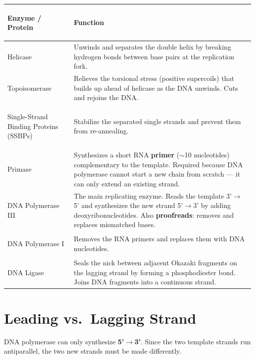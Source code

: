\documentclass[11pt, letterpaper]{article}
\begin{document}
\noindent
{\renewcommand{\arraystretch}{1.6}
\begin{tabularx}{\textwidth}{>{\bfseries\raggedright\arraybackslash}p{3.5cm}
                              >{\raggedright\arraybackslash}X}
\toprule
\rowcolor{tableheaderorange}
\textbf{Enzyme / Protein} & \textbf{Function} \\
\midrule
\rowcolor{rowOr} Helicase & Unwinds and separates the double helix by breaking hydrogen bonds between base pairs at the replication fork. \\
\rowcolor{rowA}  Topoisomerase & Relieves the torsional stress (positive supercoils) that builds up ahead of helicase as the DNA unwinds. Cuts and rejoins the DNA. \\
\rowcolor{rowOr} Single-Strand Binding Proteins (SSBPs) & Stabilize the separated single strands and prevent them from re-annealing. \\
\rowcolor{rowA}  Primase & Synthesizes a short RNA \textbf{primer} ($\sim$10 nucleotides) complementary to the template. Required because DNA polymerase cannot start a new chain from scratch --- it can only extend an existing strand. \\
\rowcolor{rowOr} DNA Polymerase III & The main replicating enzyme. Reads the template 3'$\to$5' and synthesizes the new strand 5'$\to$3' by adding deoxyribonucleotides. Also \textbf{proofreads}: removes and replaces mismatched bases. \\
\rowcolor{rowA}  DNA Polymerase I & Removes the RNA primers and replaces them with DNA nucleotides. \\
\rowcolor{rowOr} DNA Ligase & Seals the nick between adjacent Okazaki fragments on the lagging strand by forming a phosphodiester bond. Joins DNA fragments into a continuous strand. \\
\bottomrule
\end{tabularx}}

\section*{Leading vs.\ Lagging Strand}

DNA polymerase can only synthesize \textbf{5'$\to$3'}. Since the two template strands run
antiparallel, the two new strands must be made differently.
\end{document}
